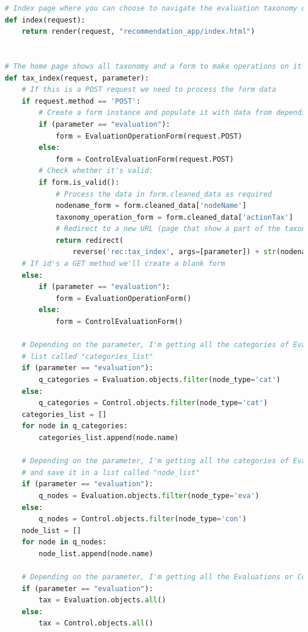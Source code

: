 \lstset{style=python_code_style}
\label{lst:view}
\begin{lstlisting}[language=Python, caption={Parti principali del codice delle View della soluzione per gestire la navigazione 
	delle tassonomie, quella delle Evaluation e quella dei Controlli}]
# Index page where you can choose to navigate the evaluation taxonomy or the control taxonomy
def index(request):
	return render(request, "recommendation_app/index.html")


# The home page shows all taxonomy and a form to make operations on it
def tax_index(request, parameter):
	# If this is a POST request we need to process the form data
	if request.method == 'POST':
		# Create a form instance and populate it with data from depending on the parameter
		if (parameter == "evaluation"):
			form = EvaluationOperationForm(request.POST)
		else:
			form = ControlEvaluationForm(request.POST)
		# Check whether it's valid:
		if form.is_valid():
			# Process the data in form.cleaned_data as required
			nodename_form = form.cleaned_data['nodeName']
			taxonomy_operation_form = form.cleaned_data['actionTax']
			# Redirect to a new URL (page that show a part of the taxonomy, depending on the action user has chosen):
			return redirect(
				reverse('rec:tax_index', args=[parameter]) + str(nodename_form) + '_' + taxonomy_operation_form)
	# If id's a GET method we'll create a blank form
	else:
		if (parameter == "evaluation"):
			form = EvaluationOperationForm()
		else:
			form = ControlEvaluationForm()

	# Depending on the parameter, I'm getting all the categories of Evaluations or Controls taxonomy and save it in a
	# list called "categories_list"
	if (parameter == "evaluation"):
		q_categories = Evaluation.objects.filter(node_type='cat')
	else:
		q_categories = Control.objects.filter(node_type='cat')
	categories_list = []
	for node in q_categories:
		categories_list.append(node.name)

	# Depending on the parameter, I'm getting all the categories of Evaluations or Controls node in the taxonomy
	# and save it in a list called "node_list"
	if (parameter == "evaluation"):
		q_nodes = Evaluation.objects.filter(node_type='eva')
	else:
		q_nodes = Control.objects.filter(node_type='con')
	node_list = []
	for node in q_nodes:
		node_list.append(node.name)

	# Depending on the parameter, I'm getting all the Evaluations or Controls taxonomy
	if (parameter == "evaluation"):
		tax = Evaluation.objects.all()
	else:
		tax = Control.objects.all()


\end{lstlisting}
